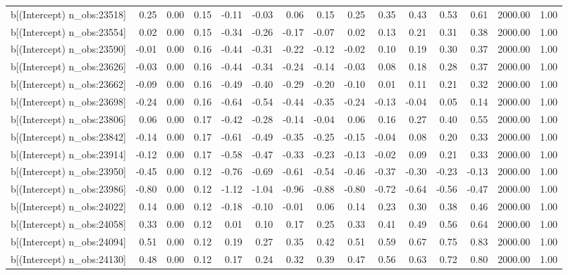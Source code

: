 \begin{table}[ht]
\begin{tabular}{rrrrrrrrrrrrrrr}
  b[(Intercept) n\_obs:23518] & 0.25 & 0.00 & 0.15 & -0.11 & -0.03 & 0.06 & 0.15 & 0.25 & 0.35 & 0.43 & 0.53 & 0.61 & 2000.00 & 1.00 \\ 
  b[(Intercept) n\_obs:23554] & 0.02 & 0.00 & 0.15 & -0.34 & -0.26 & -0.17 & -0.07 & 0.02 & 0.13 & 0.21 & 0.31 & 0.38 & 2000.00 & 1.00 \\ 
  b[(Intercept) n\_obs:23590] & -0.01 & 0.00 & 0.16 & -0.44 & -0.31 & -0.22 & -0.12 & -0.02 & 0.10 & 0.19 & 0.30 & 0.37 & 2000.00 & 1.00 \\ 
  b[(Intercept) n\_obs:23626] & -0.03 & 0.00 & 0.16 & -0.44 & -0.34 & -0.24 & -0.14 & -0.03 & 0.08 & 0.18 & 0.28 & 0.37 & 2000.00 & 1.00 \\ 
  b[(Intercept) n\_obs:23662] & -0.09 & 0.00 & 0.16 & -0.49 & -0.40 & -0.29 & -0.20 & -0.10 & 0.01 & 0.11 & 0.21 & 0.32 & 2000.00 & 1.00 \\ 
  b[(Intercept) n\_obs:23698] & -0.24 & 0.00 & 0.16 & -0.64 & -0.54 & -0.44 & -0.35 & -0.24 & -0.13 & -0.04 & 0.05 & 0.14 & 2000.00 & 1.00 \\ 
  b[(Intercept) n\_obs:23806] & 0.06 & 0.00 & 0.17 & -0.42 & -0.28 & -0.14 & -0.04 & 0.06 & 0.16 & 0.27 & 0.40 & 0.55 & 2000.00 & 1.00 \\ 
  b[(Intercept) n\_obs:23842] & -0.14 & 0.00 & 0.17 & -0.61 & -0.49 & -0.35 & -0.25 & -0.15 & -0.04 & 0.08 & 0.20 & 0.33 & 2000.00 & 1.00 \\ 
  b[(Intercept) n\_obs:23914] & -0.12 & 0.00 & 0.17 & -0.58 & -0.47 & -0.33 & -0.23 & -0.13 & -0.02 & 0.09 & 0.21 & 0.33 & 2000.00 & 1.00 \\ 
  b[(Intercept) n\_obs:23950] & -0.45 & 0.00 & 0.12 & -0.76 & -0.69 & -0.61 & -0.54 & -0.46 & -0.37 & -0.30 & -0.23 & -0.13 & 2000.00 & 1.00 \\ 
  b[(Intercept) n\_obs:23986] & -0.80 & 0.00 & 0.12 & -1.12 & -1.04 & -0.96 & -0.88 & -0.80 & -0.72 & -0.64 & -0.56 & -0.47 & 2000.00 & 1.00 \\ 
  b[(Intercept) n\_obs:24022] & 0.14 & 0.00 & 0.12 & -0.18 & -0.10 & -0.01 & 0.06 & 0.14 & 0.23 & 0.30 & 0.38 & 0.46 & 2000.00 & 1.00 \\ 
  b[(Intercept) n\_obs:24058] & 0.33 & 0.00 & 0.12 & 0.01 & 0.10 & 0.17 & 0.25 & 0.33 & 0.41 & 0.49 & 0.56 & 0.64 & 2000.00 & 1.00 \\ 
  b[(Intercept) n\_obs:24094] & 0.51 & 0.00 & 0.12 & 0.19 & 0.27 & 0.35 & 0.42 & 0.51 & 0.59 & 0.67 & 0.75 & 0.83 & 2000.00 & 1.00 \\ 
  b[(Intercept) n\_obs:24130] & 0.48 & 0.00 & 0.12 & 0.17 & 0.24 & 0.32 & 0.39 & 0.47 & 0.56 & 0.63 & 0.72 & 0.80 & 2000.00 & 1.00 \\ 

\end{tabular}
\end{table}
